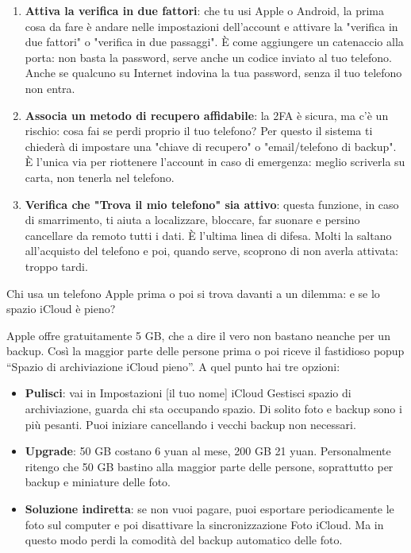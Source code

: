 \begin{enumerate}
  \item \textbf{Attiva la verifica in due fattori}: che tu usi Apple o Android, la prima cosa da fare è andare nelle impostazioni dell'account e attivare la "verifica in due fattori" o "verifica in due passaggi". È come aggiungere un catenaccio alla porta: non basta la password, serve anche un codice inviato al tuo telefono. Anche se qualcuno su Internet indovina la tua password, senza il tuo telefono non entra.
  \item \textbf{Associa un metodo di recupero affidabile}: la 2FA è sicura, ma c'è un rischio: cosa fai se perdi proprio il tuo telefono? Per questo il sistema ti chiederà di impostare una "chiave di recupero" o "email/telefono di backup". È l'unica via per riottenere l'account in caso di emergenza: meglio scriverla su carta, non tenerla nel telefono.
  \item \textbf{Verifica che "Trova il mio telefono" sia attivo}: questa funzione, in caso di smarrimento, ti aiuta a localizzare, bloccare, far suonare e persino cancellare da remoto tutti i dati. È l'ultima linea di difesa. Molti la saltano all'acquisto del telefono e poi, quando serve, scoprono di non averla attivata: troppo tardi.
\end{enumerate}


Chi usa un telefono Apple prima o poi si trova davanti a un dilemma: e se lo spazio iCloud è pieno?

Apple offre gratuitamente 5 GB, che a dire il vero non bastano neanche per un backup. Così la maggior parte delle persone prima o poi riceve il fastidioso popup “Spazio di archiviazione iCloud pieno”. A quel punto hai tre opzioni:

\begin{itemize}
  \item \textbf{Pulisci}: vai in Impostazioni [il tuo nome] iCloud Gestisci spazio di archiviazione, guarda chi sta occupando spazio. Di solito foto e backup sono i più pesanti. Puoi iniziare cancellando i vecchi backup non necessari.
  \item \textbf{Upgrade}: 50 GB costano 6 yuan al mese, 200 GB 21 yuan. Personalmente ritengo che 50 GB bastino alla maggior parte delle persone, soprattutto per backup e miniature delle foto.
  \item \textbf{Soluzione indiretta}: se non vuoi pagare, puoi esportare periodicamente le foto sul computer e poi disattivare la sincronizzazione Foto iCloud. Ma in questo modo perdi la comodità del backup automatico delle foto.
\end{itemize}

